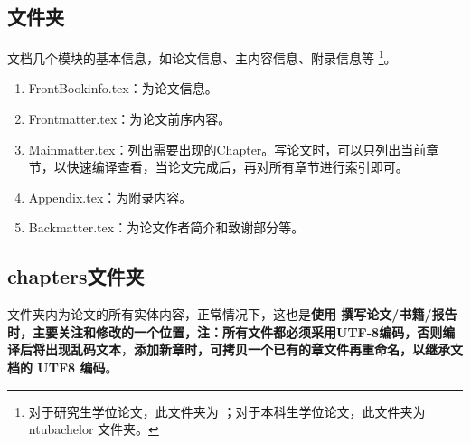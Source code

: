 \subsection{ \projectname 文件夹}
文档几个模块的基本信息，如论文信息、主内容信息、附录信息等 \footnote{对于研究生学位论文，此文件夹为 \projectname；对于本科生学位论文，此文件夹为 ntubachelor 文件夹。}。
\begin{enumerate}
    \item FrontBookinfo.tex：为论文信息。
    \item Frontmatter.tex：为论文前序内容。
    \item Mainmatter.tex：列出需要出现的Chapter。写论文时，可以只列出当前章节，以快速编译查看，当论文完成后，再对所有章节进行索引即可。
    \item Appendix.tex：为附录内容。
    \item Backmatter.tex：为论文作者简介和致谢部分等。
\end{enumerate}

\subsection{chapters文件夹}
文件夹内为论文的所有实体内容，正常情况下，这也是\textbf{使用 \projectname 撰写论文/书籍/报告时，主要关注和修改的一个位置，注：所有文件都必须采用UTF-8编码，否则编译后将出现乱码文本}，\textbf{添加新章时，可拷贝一个已有的章文件再重命名，以继承文档的 UTF8 编码}。

